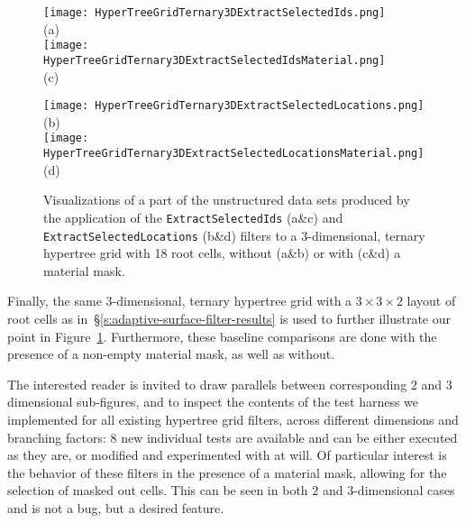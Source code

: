 \begin{figure}[h!]
\centering
\begin{minipage}[t]{0.48\columnwidth}
\centering
\vspace{0pt}
\texttt{[image: HyperTreeGridTernary3DExtractSelectedIds.png]}\\
(a)\\[2mm]
\texttt{[image: HyperTreeGridTernary3DExtractSelectedIdsMaterial.png]}\\
(c)
\end{minipage}
\hfil
\begin{minipage}[t]{0.48\columnwidth}
\centering
\vspace{0pt}
\texttt{[image: HyperTreeGridTernary3DExtractSelectedLocations.png]}\\
(b)\\[2mm]
\texttt{[image: HyperTreeGridTernary3DExtractSelectedLocationsMaterial.png]}\\
(d)
\end{minipage}
\caption{Visualizations of a part of the unstructured data sets
produced by the application of the \texttt{ExtractSelectedIds} (a\&c) and
\texttt{ExtractSelectedLocations} (b\&d) filters to a
$3$-dimensional, ternary hypertree grid with 18 root cells, without
(a\&b) or with (c\&d) a material mask.}
\label{fig:HyperTreeGridTernary3DExtractSelectedFilter}
\end{figure}

Finally, the same $3$-dimensional, ternary hypertree grid with a
$3\times3\times2$ layout of root cells as
in~\S\ref{s:adaptive-surface-filter-results} is used to further
illustrate our point in
Figure~\ref{fig:HyperTreeGridTernary3DExtractSelectedFilter}.
Furthermore, these baseline comparisons are done with the presence of
a non-empty material mask, as well as without.

The interested reader is invited to draw parallels between
corresponding $2$ and $3$ dimensional sub-figures, and to inspect the
contents of the test harness we implemented for all existing hypertree
grid filters, across different dimensions and branching factors:
8 new individual tests are available and can be either executed
as they are, or modified and experimented with at will.
Of particular interest is the behavior of these
filters in the presence of a material mask, allowing for the
selection of masked out cells.
This can be seen in both $2$ and $3$-dimensional cases and is not a
bug, but a desired feature.
